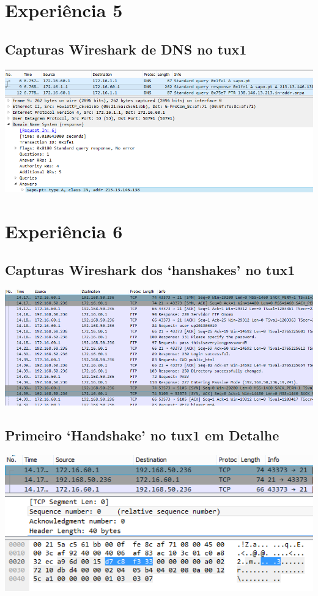\documentclass[11pt,a4paper,reqno]{report}
\numberwithin{equation}{section}
\begin{document}
\begin{appendices}
\section{Experiência 5}%

\subsection{Capturas Wireshark de DNS no tux1}
\label{ex5_dns}
\includegraphics[width=16cm]{ex5_dns.png}

\section{Experiência 6}%

\subsection{Capturas Wireshark dos `hanshakes' no tux1}
\label{ex6_tux1_handshakes}
\includegraphics[width=16cm]{ex6_tux1_handshakes.png}

\subsection{Primeiro `Handshake' no tux1 em Detalhe}
\label{ex6_tux1_1sthandshake}
\includegraphics[width=16cm]{ex6_handshake1.png}


\end{appendices}
\end{document}
